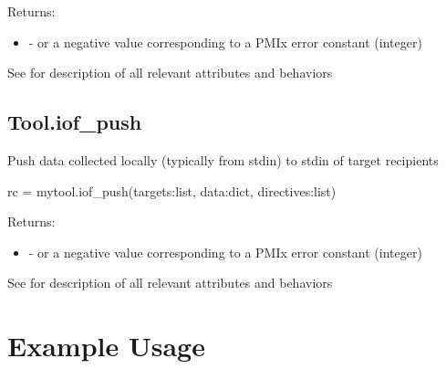\begin{arglist}
\end{arglist}

Returns:

\begin{itemize}
    \item {} -  or a negative value corresponding to a PMIx error constant (integer)
\end{itemize}


See  for description of all relevant attributes and behaviors


\subsection{Tool.iof_push}

\summary

Push data collected locally (typically from stdin) to
stdin of target recipients

\format

\pyspecificstart
\begin{codepar}
rc = mytool.iof_push(targets:list, data:dict, directives:list)
\end{codepar}
\pyspecificend

\begin{arglist}
\end{arglist}

Returns:

\begin{itemize}
    \item {} -  or a negative value corresponding to a PMIx error constant (integer)
\end{itemize}


See  for description of all relevant attributes and behaviors


\section{Example Usage}
\label{app:python:examples}

